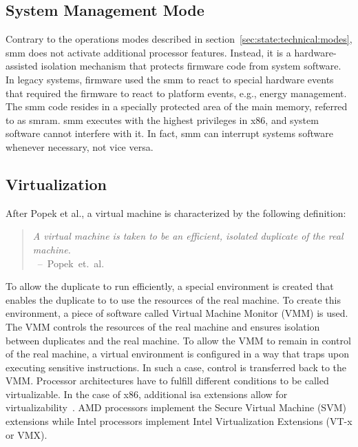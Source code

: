 \subsection{System Management Mode}
\label{sec:state:technical:smm}
Contrary to the operations modes described in
section~\ref{sec:state:technical:modes}, \gls{smm} does not activate additional
processor features. Instead, it is a hardware-assisted isolation mechanism that
protects firmware code from system software. In legacy systems, firmware used
the \gls{smm} to react to special hardware events that required the firmware to
react to platform events, e.g., energy management\cite{intel_sdm}. The \gls{smm}
code resides in a specially protected area of the main memory, referred to as
\gls{smram}. \gls{smm} executes with the highest privileges in x86, and system
software cannot interfere with it. In fact, \gls{smm} can interrupt systems
software whenever necessary, not vice versa.

\subsection{Virtualization}
\label{sec:state:technical:virt}
After Popek et al., a virtual machine is characterized by the following
definition:
\begin{quote}
  \textit{ A virtual machine is taken to be an efficient, isolated duplicate of
    the real machine. \\
  } \mbox{ -- Popek et. al. ~\cite{popek1974formal}}
\end{quote}
To allow the duplicate to run efficiently, a special environment is created that
enables the duplicate to to use the resources of the real machine. To create this
environment, a piece of software called Virtual Machine Monitor (VMM) is used.
The VMM controls the resources of the real machine and ensures isolation between
duplicates and the real machine. To allow the VMM to remain in control of the
real machine, a virtual environment is configured in a way that traps upon
executing sensitive instructions. In such a case, control is transferred back to
the VMM. Processor architectures have to fulfill different conditions to be
called virtualizable. In the case of x86, additional \gls{isa} extensions
allow for virtualizability~\cite {adams2006comparison}. AMD processors
implement the Secure Virtual Machine (SVM) extensions while Intel processors
implement Intel Virtualization Extensions (VT-x or VMX)\cite{amd_manual,
intel_sdm}.


